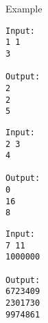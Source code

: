 Example
\begin{verbatim}
Input:
1 1
3

Output:
2
2
5
\end{verbatim}
\begin{verbatim}
Input:
2 3
4

Output:
0
16
8
\end{verbatim}
\begin{verbatim}
Input:
7 11
1000000

Output:
6723409
2301730
9974861
\end{verbatim}